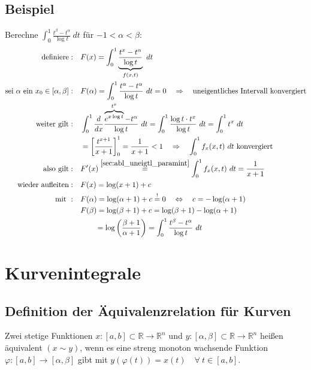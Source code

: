 \documentclass[11pt,a4paper]{book}
\newcommand {\R}	{\mathbb{R}}
\newcommand {\Rn}	{\mathbb{R}^n}
\newcommand{\1}    	{\mathbbm{1}}
\newcommand{\mitt}	{\textrm{ mit }}
\begin{document}
\subsection{Beispiel}
Berechne \(\int_0^1 \frac{t^\beta - t^\alpha}{\log t} ~dt \) für \(-1 < \alpha < \beta\):
\begin{align*}
	\textrm{definiere}:&\quad F(x) = \int_0^1 \underbrace{\frac{t^x - t^\alpha}{\log t}}_{f(x,t)} ~dt \\
	\textrm{sei } \alpha \textrm{ ein } x_0 \in [\alpha,\beta]:&\quad
	F(\alpha) = \int_0^1 \frac{t^\alpha - t^\alpha}{\log t} ~dt = 0 \quad \Rightarrow\quad \textrm{uneigentliches Intervall konvergiert} \\
	\textrm{weiter gilt}:&\quad
	\int_0^1 \frac{d}{dx} \frac{ \overbrace{e^{x\log t}}^{t^x} - t^\alpha}{\log t} ~dt = \int_0^1 \frac{\log t \cdot t^x}{\log t}~dt = \int_0^1 t^x ~dt \\
	&\quad = \left[ \frac{t^{x+1}}{x+1} \right]_0^1 = \frac{1}{x+1} < 1 \quad\Rightarrow\quad \int_0^1 f_x(x,t) ~dt \textrm{ konvergiert} \\
	\textrm{also gilt}:&\quad F'(x) \stackrel{\ref{sec:abl_uneigtl_paramint}}{=} \int_0^1 f_x(x,t) ~dt = \frac{1}{x+1} \\
	\textrm{wieder aufleiten}:&\quad F(x) = \log(x+1) + c \\
	\mitt: &\quad F(\alpha) = \log(\alpha + 1) + c \stackrel{!}{=} 0 
	\quad\Leftrightarrow\quad c = -\log(\alpha+1) \\
	&\quad F(\beta) = \log(\beta + 1) + c = \log(\beta + 1) - \log(\alpha + 1) \\
	&\qquad\quad = \log\left(\frac{\beta+1}{\alpha+1}\right)
	= \int_0^1 \frac{t^\beta - t^\alpha}{\log t} ~dt
\end{align*}

\section{Kurvenintegrale}

\subsection{Definition der Äquivalenzrelation für Kurven}
Zwei stetige Funktionen \(x:[a,b] \subset \R \rightarrow \Rn\) und \(y:[\alpha,\beta] \subset \R \rightarrow \Rn\) heißen äquivalent \((x \sim y)\), wenn es eine streng monoton wachsende Funktion \(\varphi:[a,b] \rightarrow [\alpha,\beta]\) gibt mit \(y(\varphi(t)) = x(t) \quad \forall~ t \in [a,b]\).\\
\end{document}
